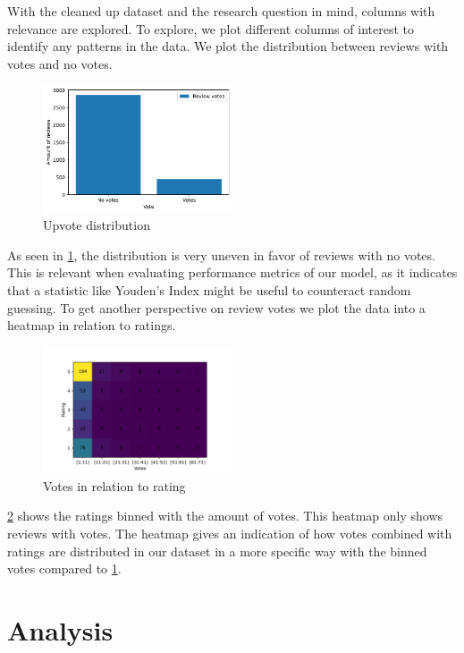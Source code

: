 \documentclass[twoside,twocolumn]{article}
\begin{document}
With the cleaned up dataset and the research question in mind, columns with relevance are explored. To explore, we plot different columns of interest to identify any patterns in the data. We plot the distribution between reviews with votes and no votes.
\begin{figure}[h]
	\centering
	\includegraphics[width=0.5\textwidth]{img/no_votes_vs_votes.pdf}
	\caption{Upvote distribution}
	\label{fig:votes_distribution}
\end{figure}
As seen in \figurename{\ref{fig:votes_distribution}}, the distribution is very uneven in favor of reviews with no votes. This is relevant when evaluating performance metrics of our model, as it indicates that a statistic like Youden's Index might be useful to counteract random guessing. To get another perspective on review votes we plot the data into a heatmap in relation to ratings.
\begin{figure}[h]
	\centering
	\includegraphics[width=0.5\textwidth]{img/rating_vote_heatmap_excluding_no_votes.pdf}
	\caption{Votes in relation to rating}
	\label{fig:rating_vote_heatmap}
\end{figure}
\figurename{\ref{fig:rating_vote_heatmap}} shows the ratings binned with the amount of votes. This heatmap only shows reviews with votes. The heatmap gives an indication of how votes combined with ratings are distributed in our dataset in a more specific way with the binned votes compared to \figurename{\ref{fig:votes_distribution}}.



\section{Analysis}
\end{document}
